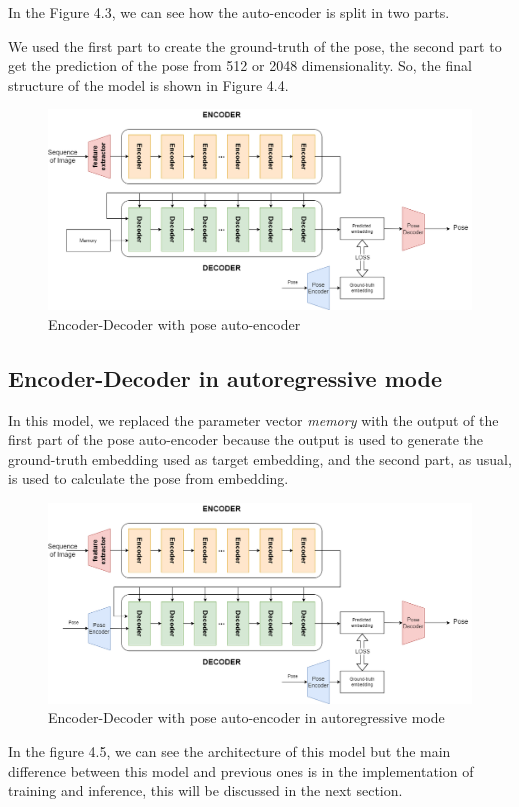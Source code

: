 In the Figure 4.3, we can see how the auto-encoder is split in two parts.

We used the first part to create the ground-truth of the pose, the second part to get the prediction of the pose from 512 or 2048 dimensionality.
So, the final structure of the model is shown in Figure 4.4.
\begin{figure}[H]
    \centering
    \includegraphics[width=\textwidth]{images/4_encoder_decoder_with_pose_autoencoder}
    \caption{Encoder-Decoder with pose auto-encoder}\label{fig:figure-encoder-decoder-with-pose-encoder}
\end{figure}

\subsection{Encoder-Decoder in autoregressive mode}\label{subsec:encoder-decoder-in-autoregressive-mode}
In this model, we replaced the parameter vector \textit{memory} with the output of the first part of the pose auto-encoder because the output is used to generate the ground-truth embedding used as target embedding, and the second part, as usual, is used to calculate the pose from embedding.

\begin{figure}[H]
    \centering
    \includegraphics[width=\textwidth]{images/4_autoregressive_model}
    \caption{Encoder-Decoder with pose auto-encoder in autoregressive mode}\label{fig:figure-auto-regressive-model}
\end{figure}

In the figure 4.5, we can see the architecture of this model but the main difference between this model and previous ones is in the implementation of training and inference, this will be discussed in the next section.
